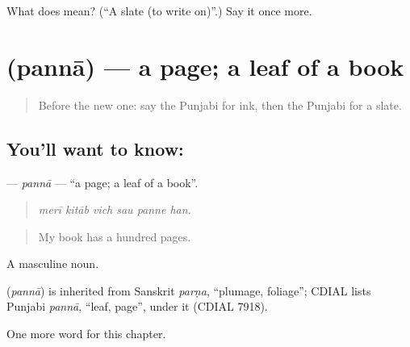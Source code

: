 \begin{tcolorbox}[breakable,colback=teal!4,colframe=teal!35!black,title={Before you move on}]
What does  mean? (\textquotedblleft{}A slate (to write on)\textquotedblright{}.) Say it once more.
\end{tcolorbox}
\section[\texorpdfstring{\pa{ਪੰਨਾ} (pannā)}{ਪੰਨਾ (pannā)}]{ (pannā) — a page; a leaf of a book}

\label{lesson:PA-C357-panna}



\begin{quote}
Before the new one: say the Punjabi for ink, then the Punjabi for a slate.
\end{quote}

\subsection*{You'll want to know: }
\textbf{} — \emph{pannā} — \textquotedblleft{}a page; a leaf of a book\textquotedblright{}.

\begin{quote}
     
\end{quote}

\begin{quote}
\emph{merī kitāb vich sau panne han.}
\end{quote}

\begin{quote}
My book has a hundred pages.
\end{quote}

A masculine noun.

\begin{cousinweb}
\textbf{} (\emph{pannā}) is inherited from Sanskrit \emph{parṇa}, \textquotedblleft{}plumage, foliage\textquotedblright{}; CDIAL lists Punjabi \emph{pannā}, \textquotedblleft{}leaf, page\textquotedblright{}, under it (CDIAL 7918).
\end{cousinweb}

\begin{grammarlens}[title={What you've built}]
One more word for this chapter.
\end{grammarlens}

